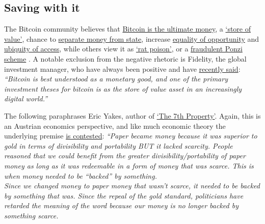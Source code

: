 \begin{itemize}
\subsection{Saving with it} 
The Bitcoin community believes that \href{https://svetski.medium.com/why-bitcoin-not-shitcoin-6cc826f4fa52}{Bitcoin is the ultimate money}, a \href{https://www.coindesk.com/business/2022/01/07/jpmorgan-sees-more-crypto-adoption-in-2022-debates-bitcoins-status-as-store-of-value/}{`store of value'}, chance to \href{https://www.forbes.com/sites/leeorshimron/2020/06/30/bitcoin-is-the-separation-of-money-and-state/?sh=49294a8356db}{separate money from state}, increase \href{https://www.washingtonpost.com/national/locked-out-of-traditional-financial-industry-more-people-of-color-are-turning-to-cryptocurrency/2021/12/01/a21df3fa-37fe-11ec-9bc4-86107e7b0ab1_story.html}{equality of opportunity} and \href{https://iai.tv/articles/the-rich-get-richer-the-poor-get-bitcoin-auid-1766}{ubiquity of access}, while others view it as \href{https://www.cnbc.com/2021/06/22/a-third-of-investors-think-bitcoin-is-rat-poison-jpmorgan-survey-says.html}{`rat poison'}, or a \href{https://jacobinmag.com/2022/01/cryptocurrency-scam-blockchain-bitcoin-economy-decentralization}{fraudulent Ponzi scheme} \cite{ponzi2021alden}. A notable exclusion from the negative rhetoric is Fidelity, the global investment manager, who have always been positive and have \href{https://www.fidelitydigitalassets.com/articles/bitcoin-first?sf253214177=1}{recently said}: 
\textit{``Bitcoin is best understood as a monetary good, and one of the primary investment theses for bitcoin is as the store of value asset in an increasingly digital world.''}\par
The following paraphrases Eric Yakes, author of \href{https://yakes.io/book/}{`The 7th Property'}. Again, this is an Austrian economics perspective, and like much economic theory the underlying premise \href{https://medium.datadriveninvestor.com/do-you-understand-the-austrian-vs-keynesian-economic-debate-2f4b152c6a6b}{is contested}\cite{maurel2012keynesian}: \textit{``Paper became money because it was superior to gold in terms of divisibility and portability BUT it lacked scarcity. People reasoned that we could benefit from the greater divisibility/portability of paper money as long as it was redeemable in a form of money that was scarce. This is when money needed to be ``backed'' by something. \\
Since we changed money to paper money that wasn't scarce, it needed to be backed by something that was. Since the repeal of the gold standard, politicians have retarded the meaning of the word because our money is no longer backed by something scarce.\\
}
\end{itemize}
